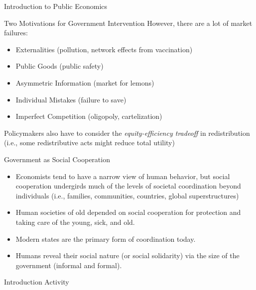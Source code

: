 \documentclass[10pt]{extarticle}
\begin{document}
\begin{problem}{Introduction to Public Economics}
\begin{problem}{Two Motivations for Government Intervention}
      However, there are a lot of market failures:
      \begin{itemize}
        \item Externalities (pollution, network effects from vaccination)
        \item Public Goods (public safety)
        \item Asymmetric Information (market for lemons)
        \item Individual Mistakes (failure to save)
        \item Imperfect Competition (oligopoly, cartelization)
      \end{itemize}
      Policymakers also have to consider the \textit{equity-efficiency tradeoff} in redistribution (i.e., some redistributive acts might reduce total utility)
    \end{problem}
    \begin{problem}{Government as Social Cooperation}
      \begin{itemize}
        \item Economists tend to have a narrow view of human behavior, but social cooperation undergirds much of the levels of societal coordination beyond individuals (i.e., families, communities, countries, global superstructures)
        \item Human societies of old depended on social cooperation for protection and taking care of the young, sick, and old.
        \item Modern states are the primary form of coordination today.
        \item Humans reveal their social nature (or social solidarity) via the size of the government (informal and formal).
      \end{itemize}
    \end{problem}
  \end{problem}
  \begin{problem}{Introduction Activity}
    \begin{tcbraster}[raster columns = 1,colframe = black!75!white,colback=white]
    \end{tcbraster}
  \end{problem}
\end{document}
